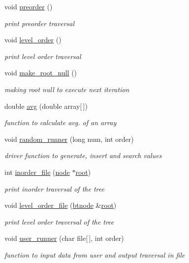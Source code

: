 \begin{DoxyCompactItemize}
void \hyperlink{class_btree_1_1utility_a727f33e9636c1fbd56f017fb696e9366}{preorder} ()
\begin{DoxyCompactList}\small\item\em print preorder traversal \end{DoxyCompactList}\item 
void \hyperlink{class_btree_1_1utility_a0e324dea11da1a7506902a9b27ba5d1c}{level\-\_\-order} ()
\begin{DoxyCompactList}\small\item\em print level order traversal \end{DoxyCompactList}\item 
void \hyperlink{class_btree_1_1utility_ab4516eb224c343ce53952c51c2257ce8}{make\-\_\-root\-\_\-null} ()
\begin{DoxyCompactList}\small\item\em making root null to execute next iteration \end{DoxyCompactList}\item 
double \hyperlink{class_btree_1_1utility_a35f74d0f0bd158f023efe95e8e506947}{avg} (double array\mbox{[}$\,$\mbox{]})
\begin{DoxyCompactList}\small\item\em function to calculate avg. of an array \end{DoxyCompactList}\item 
void \hyperlink{class_btree_1_1utility_a3f2ae2f39c7f908ddaca9b1a45d9c3c0}{random\-\_\-runner} (long num, int order)
\begin{DoxyCompactList}\small\item\em driver function to generate, insert and search values \end{DoxyCompactList}\item 
int \hyperlink{class_btree_1_1utility_abfaed921f7bfa93c86bf68fd252400fc}{inorder\-\_\-file} (\hyperlink{class_btree_1_1node}{node} $\ast$\hyperlink{class_btree_1_1utility_a240cdc9a802b5d396fb15ebf2bf1e3de}{root})
\begin{DoxyCompactList}\small\item\em print inorder traversal of the tree \end{DoxyCompactList}\item 
void \hyperlink{class_btree_1_1utility_a8388fec52c70801733166954a2d3cee0}{level\-\_\-order\-\_\-file} (\hyperlink{namespace_btree_af2177a710b4e16aaf0c14dcbbc01a9af}{btnode} \&\hyperlink{class_btree_1_1utility_a240cdc9a802b5d396fb15ebf2bf1e3de}{root})
\begin{DoxyCompactList}\small\item\em print level order traversal of the tree \end{DoxyCompactList}\item 
void \hyperlink{class_btree_1_1utility_a86a89ae68a8410223e7bc215749a93ab}{user\-\_\-runner} (char file\mbox{[}$\,$\mbox{]}, int order)
\begin{DoxyCompactList}\small\item\em function to input data from user and output traversal in file \end{DoxyCompactList}\end{DoxyCompactItemize}
